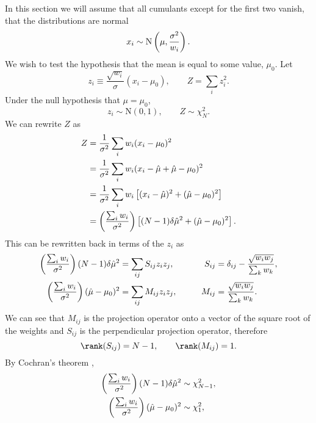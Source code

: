 \documentclass[12pt]{article}
\newcommand{\mh}{\hat\mu}
\begin{document}
In this section we will assume that all cumulants except for the first two vanish, \ie that the distributions are normal
%
\begin{equation}\label{eq:scalednormal}
  x_i \sim \text{N}\left ( \mu,\frac{\sigma^2}{w_i} \right ). 
\end{equation}
%
We wish to test the hypothesis that the mean is equal to some value, $\mu_0$. Let
%
\begin{equation}\label{eq:stdvars}
  z_i \equiv \frac{\sqrt{w_i}}{\sigma}(x_i-\mu_0),
  \qquad
  Z = \sum_i z_i^2.
\end{equation}
%
Under the null hypothesis that $\mu=\mu_0$,
%
\begin{equation}\label{eq:stddists}
  z_i \sim \text{N}(0,1),
  \qquad
  Z \sim \chi^2_N.
\end{equation}
%
We can rewrite $Z$ as
%
\begin{equation}\label{eq:cochranversion}
  \begin{aligned}
    Z &= \frac{1}{\sigma^2} \sum_i w_i (x_i - \mu_0)^2 \\
      &= \frac{1}{\sigma^2} \sum_i w_i (x_i - \mh + \mh - \mu_0)^2 \\
      &= \frac{1}{\sigma^2} \sum_i w_i \brk{(x_i - \mh)^2 + (\mh - \mu_0)^2} \\
      &= \prn{\frac{\sum_i w_i}{\sigma^2}}  \brk{(N-1)\delta\mh^2 + (\mh - \mu_0)^2}.
  \end{aligned}
\end{equation}
%
This can be rewritten back in terms of the $z_i$ as
%
\begin{equation}\label{eq:cochrancoeffs}
  \begin{aligned}
    \prn{\frac{\sum_i w_i}{\sigma^2}}  (N-1)\delta\mh^2 &= \sum_{ij} S_{ij} z_i z_j, 
    &\qquad
     S_{ij} &= \delta_{ij} - \frac{\sqrt{w_i w_j}}{\sum_k w_k}, \\
    \prn{\frac{\sum_i w_i}{\sigma^2}}  (\mh - \mu_0)^2  &= \sum_{ij} M_{ij} z_i z_j,
    &\qquad
     M_{ij} &= \frac{\sqrt{w_i w_j}}{\sum_k w_k}.
  \end{aligned}
\end{equation}
%
We can see that $M_{ij}$ is the projection operator onto a vector of the square root of the weights and $S_{ij}$ is the perpendicular projection operator, therefore
%
\begin{equation}\label{eq:cochranrank}
  \rank(S_{ij}) = N-1, \qquad \rank(M_{ij}) = 1.
\end{equation}
%
By Cochran's theorem \cite{Cochran:1934},
%
\begin{equation}\label{eq:cochrandist}
  \begin{aligned}
    \prn{\frac{\sum_i w_i}{\sigma^2}}  (N-1)\delta\mh^2 &\sim \chi^2_{N-1}, \\
    \prn{\frac{\sum_i w_i}{\sigma^2}}  (\mh - \mu_0)^2  &\sim \chi^2_{1},
  \end{aligned}
\end{equation}
\end{document}
